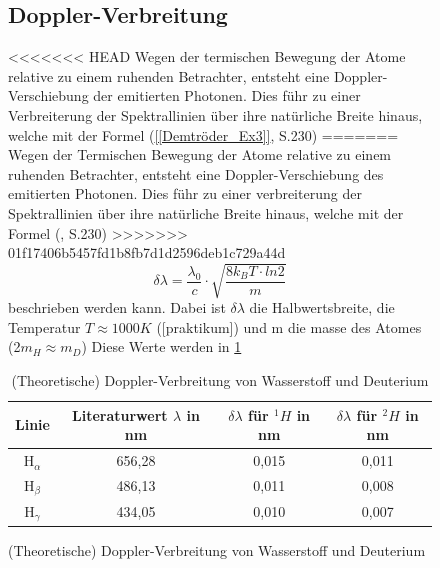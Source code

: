 \begin{figure}
\subsection{Doppler-Verbreitung}

<<<<<<< HEAD
Wegen der termischen Bewegung der Atome relative zu einem ruhenden Betrachter, entsteht eine Doppler-Verschiebung der emitierten Photonen. 
Dies führ zu einer Verbreiterung der Spektrallinien über ihre natürliche Breite hinaus, welche mit der Formel (\cref{[Demtröder_Ex3]}, S.230)
=======
Wegen der Termischen Bewegung der Atome relative zu einem ruhenden Betrachter, entsteht eine Doppler-Verschiebung des emitierten Photonen. 
Dies führ zu einer verbreiterung der Spektrallinien über ihre natürliche Breite hinaus, welche mit der Formel (\cite{Demtröder_Ex3}, S.230)
>>>>>>> 01f17406b5457fd1b8fb7d1d2596deb1c729a44d
\begin{equation}
    \delta\lambda = \frac{\lambda_0}{c}\cdot \sqrt{\frac{8k_BT\cdot ln2}{m}}
\end{equation}
beschrieben werden kann.
Dabei ist $\delta\lambda$ die Halbwertsbreite, die Temperatur $T \approx 1000K$ ([praktikum]) und m die masse des Atomes (2$m_H \approx m_D$)
Diese Werte werden in \cref{tab:dopplerTemp}
\begin{table}[htbp]
    \centering
    \begin{tabular}{|c|c|c|c|}
    \hline
    Linie & Literaturwert $\lambda$ in nm & $\delta\lambda$ für $^1H$ in nm & $\delta\lambda$ für $^2H$ in nm \\
    \midrule
    H$_\alpha$ & 656,28 & 0,015 & 0,011 \\
    H$_\beta$ & 486,13 & 0,011 & 0,008 \\
    H$_\gamma$  & 434,05 & 0,010 & 0,007 \\
    \hline
    \end{tabular}
    \caption{(Theoretische) Doppler-Verbreitung von Wasserstoff und Deuterium}
    \label{tab:dopplerTemp}
\end{table}


\end{figure}

